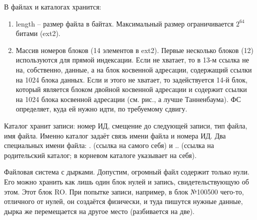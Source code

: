 \documentclass[a4paper,10pt]{article}
\begin{document}
В файлах и каталогах хранится:
\begin{enumerate}
\item length -- размер файла в байтах. Максимальный размер ограничивается $2^64$ битами (ext2).
\item Массив номеров блоков (14 элементов в ext2). Первые несколько блоков (12) используются для прямой индексации.
Если не хватает, то в 13-м ссылка не на, собственно, данные, а на блок косвенной адресации, содержащий ссылки на 1024 блока данных.
Если и этого не хватает, то задействуется 14-й блок, который является блоком двойной косвенной адресации и содержит ссылки на 1024 блока косвенной адресации (см. рис., а лучше Танненбаума).
ФС определяет, куда ей нужно идти, по требуемому сдвигу.
\end{enumerate}

Каталог хранит записи:
номер ИД, смещение до следующей записи, тип файла, имя файла. Именно каталог задаёт связь имени файла и номера ИД.
Два специальных имени файла: . (ссылка на самого себя) и .. (ссылка на родительский каталог; в корневом каталоге указывает на себя).

Файловая система с дырками. 
Допустим, огромный файл содержит только нули. Его можно хранить как лишь один блок нулей и запись, свидетельствующую об этом. Этот блок RO. При попытке записи, например, в блок №100500 чего-то, отличного от нулей, он создаётся физически, и туда пишутся нужные данные, дырка же перемещается на другое место (разбивается на две).
\end{document}
